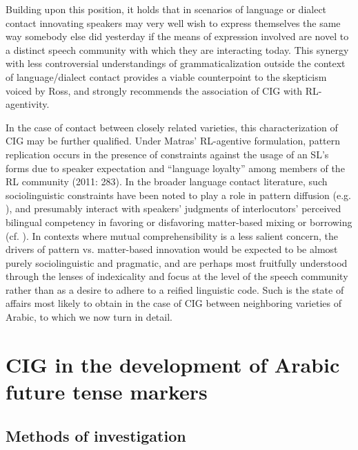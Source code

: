 \documentclass[output=paper]{langsci/langscibook}
\begin{document}
Building upon this position, it holds that in scenarios of language or dialect contact innovating speakers may very well wish to express themselves the same way somebody else did yesterday if the means of expression involved are novel to a distinct speech community with which they are interacting today. This synergy with less controversial understandings of grammaticalization outside the context of language/dialect contact provides a viable counterpoint to the skepticism voiced by Ross, and strongly recommends the association of CIG with RL-agentivity.

In the case of contact between closely related varieties, this characterization of CIG may be further qualified. Under Matras’ RL-agentive formulation, pattern replication occurs in the presence of constraints against the usage of an SL’s forms due to speaker expectation and “language loyalty” among members of the RL community (2011: 283).  In the broader language contact literature, such sociolinguistic constraints have been noted to play a role in pattern diffusion (e.g. \citealt{Epps2005}), and presumably interact with speakers’ judgments of interlocutors’ perceived bilingual competency in favoring or disfavoring matter-based mixing or borrowing (cf. \citealt{Grosjean2001}). In contexts where mutual comprehensibility is a less salient concern, the drivers of pattern vs. matter-based innovation would be expected to be almost purely sociolinguistic and pragmatic, and are perhaps most fruitfully understood through the lenses of indexicality \citep{Silverstein2003} and focus at the level of the speech community \citep{LePageTabouret-Keller1985} rather than as a desire to adhere to a reified linguistic code. Such is the state of affairs most likely to obtain in the case of CIG between neighboring varieties of Arabic, to which we now turn in detail.

\section{ CIG in the development of Arabic future tense markers}

\subsection{ Methods of investigation}
\end{document}
